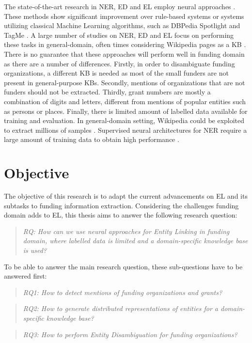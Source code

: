 \documentclass{report}
\theoremstyle{definition}
\theoremstyle{remark}
\begin{document}
The state-of-the-art research in NER, ED and EL employ neural approaches \cite{REL,LUKE,mulang}. These methods show significant improvement over rule-based systems or systems utilizing classical Machine Learning algorithms, such as DBPedia Spotlight \cite{dbpediaspotlight} and TagMe \cite{tagme}. A large number of studies on NER, ED and EL focus on performing these tasks in general-domain, often times considering Wikipedia pages as a KB \cite{nlpnotes}. There is no guarantee that these approaches will perform well in funding domain as there are a number of differences. Firstly, in order to disambiguate funding organizations, a different KB is needed as most of the small funders are not present in general-purpose KBs. Secondly, mentions of organizations that are not funders should not be extracted. Thirdly, grant numbers are mostly a combination of digits and letters, different from mentions of popular entities such as persons or places. Finally, there is limited amount of labelled data available for training and evaluation. In general-domain setting, Wikipedia could be exploited to extract millions of samples \cite{bunescu-pasca-2006-using}. Supervised neural architectures for NER require a large amount of training data to obtain high performance \cite{NERsurvey}. 

\section{Objective}

The objective of this research is to adapt the current advancements on EL and its subtasks to funding information extraction. Considering the challenges funding domain adds to EL, this thesis aims to answer the following research question:

\begin{quote}\emph{RQ: How can we use neural approaches for Entity Linking in funding domain, where labelled data is limited and a domain-specific knowledge base is used?}\end{quote}

\noindent To be able to answer the main research question, these sub-questions have to be answered first:

\begin{quote}\emph{RQ1: How to detect mentions of funding organizations and grants?}\end{quote}
\begin{quote}\emph{RQ2: How to generate distributed representations of entities for a domain-specific knowledge base?}\end{quote}
\begin{quote}\emph{RQ3: How to perform Entity Disambiguation for funding organizations?}\end{quote}
\end{document}
